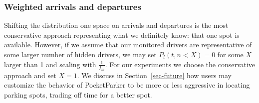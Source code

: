 \subsubsection{Weighted arrivals and departures}

Shifting the distribution one space on arrivals and departures is the most
conservative approach representing what we definitely know: that one spot is
available. However, if we assume that our monitored drivers are
representative of some larger number of hidden drivers, we may set $P_l(t, n
< X) = 0$ for some $X$ larger than 1 and scaling with $\frac{1}{f_m}$. For
our experiments we choose the conservative approach and set $X = 1$. We
discuss in Section~\ref{sec-future} how users may customize the behavior of
PocketParker to be more or less aggressive in locating parking spots, trading
off time for a better spot.
